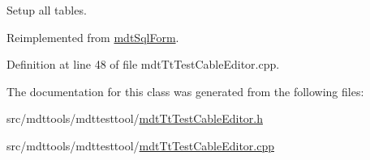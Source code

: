 Setup all tables. 



Reimplemented from \hyperlink{classmdt_sql_form_a27fe6e45aa5d4d7782aad9833e6de20b}{mdt\-Sql\-Form}.



Definition at line 48 of file mdt\-Tt\-Test\-Cable\-Editor.\-cpp.



The documentation for this class was generated from the following files\-:\begin{DoxyCompactItemize}
\item 
src/mdttools/mdttesttool/\hyperlink{mdt_tt_test_cable_editor_8h}{mdt\-Tt\-Test\-Cable\-Editor.\-h}\item 
src/mdttools/mdttesttool/\hyperlink{mdt_tt_test_cable_editor_8cpp}{mdt\-Tt\-Test\-Cable\-Editor.\-cpp}\end{DoxyCompactItemize}
